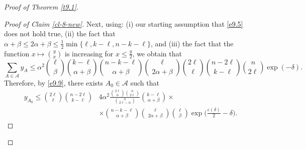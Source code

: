 \documentclass[10pt]{amsart}
\theoremstyle{remark}
\newcommand{\mik}{\leqslant}
\newcommand{\Acal}{\mathcal{A}}
\begin{document}
\begin{proof}[Proof of Theorem \emph{\ref{t9.1}}]
\begin{proof}[Proof of Claim \emph{\ref{cl-8-new}}]
Next, using: (i) our starting assumption that \eqref{e9.5} does not hold true,
(ii) the fact that $\alpha+\beta\mik 2\alpha+\beta\mik {}\min\{\ell,k-\ell,n-k-\ell\}$, and
(iii) the fact that the function $x\mapsto {}$ is increasing for $x\mik {}$,
we obtain that
\begin{equation} \label{en.9.2}
\sum_{A\in\Acal}y_{A}\mik \alpha^2\binom{\ell}{\beta}\binom{k-\ell}{\alpha+\beta}
\binom{n-k-\ell}{\alpha+\beta}\binom{\ell}{2\alpha+\beta}
\binom{2\ell}{\ell}\binom{n-2\ell}{k-\ell}\binom{n}{2\ell}\exp(-\delta).
\end{equation}
Therefore, by \eqref{e9.9}, there exists $A_0\in\Acal$ such that
\begin{align} \label{en9.3}
y_{A_0} \mik \binom{2\ell}{\ell}\binom{n-2\ell}{k-\ell} & 4\alpha^2
\frac{\binom{2\ell}{\alpha}\binom{n}{2\ell}}{\binom{n}{2\ell-\alpha}}
\binom{k-\ell}{\alpha+\beta} \times \\
& \times \binom{n-k-\ell}{\alpha+\beta}
\binom{\ell}{2\alpha+\beta}\binom{\ell}{\beta}\exp\Big(\frac{\varepsilon(\delta)}{2}-\delta\Big). \nonumber
\end{align}


\end{proof}
\end{proof}
\end{document}

